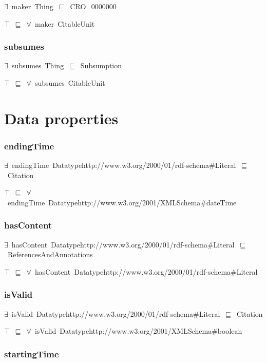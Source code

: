 \documentclass{article}
\begin{document}
\ensuremath{\exists}~maker~Thing~\ensuremath{\sqsubseteq}~CRO\_0000000

\ensuremath{\top}~\ensuremath{\sqsubseteq}~\ensuremath{\forall}~maker~CitableUnit

\subsubsection*{subsumes}

\ensuremath{\exists}~subsumes~Thing~\ensuremath{\sqsubseteq}~Subsumption

\ensuremath{\top}~\ensuremath{\sqsubseteq}~\ensuremath{\forall}~subsumes~CitableUnit

\section*{Data properties}\subsubsection*{endingTime}

\ensuremath{\exists}~endingTime~Datatypehttp://www.w3.org/2000/01/rdf-schema#Literal~\ensuremath{\sqsubseteq}~Citation

\ensuremath{\top}~\ensuremath{\sqsubseteq}~\ensuremath{\forall}~endingTime~Datatypehttp://www.w3.org/2001/XMLSchema#dateTime

\subsubsection*{hasContent}

\ensuremath{\exists}~hasContent~Datatypehttp://www.w3.org/2000/01/rdf-schema#Literal~\ensuremath{\sqsubseteq}~ReferencesAndAnnotations

\ensuremath{\top}~\ensuremath{\sqsubseteq}~\ensuremath{\forall}~hasContent~Datatypehttp://www.w3.org/2000/01/rdf-schema#Literal

\subsubsection*{isValid}

\ensuremath{\exists}~isValid~Datatypehttp://www.w3.org/2000/01/rdf-schema#Literal~\ensuremath{\sqsubseteq}~Citation

\ensuremath{\top}~\ensuremath{\sqsubseteq}~\ensuremath{\forall}~isValid~Datatypehttp://www.w3.org/2001/XMLSchema#boolean

\subsubsection*{startingTime}
\end{document}
